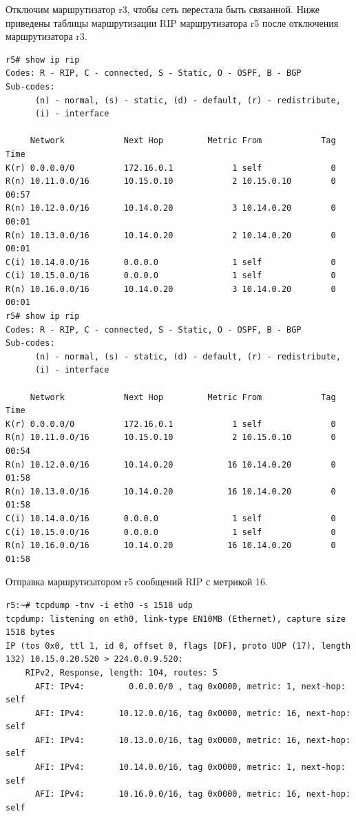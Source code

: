 \documentclass[a4paper,12pt]{article}
\begin{document}
Отключим маршрутизатор r3, чтобы сеть перестала быть связанной.
Ниже приведены таблицы маршрутизации RIP маршрутизатора r5 после отключения маршрутизатора r3.

\begin{Verbatim}
r5# show ip rip
Codes: R - RIP, C - connected, S - Static, O - OSPF, B - BGP
Sub-codes:
      (n) - normal, (s) - static, (d) - default, (r) - redistribute,
      (i) - interface

     Network            Next Hop         Metric From            Tag Time
K(r) 0.0.0.0/0          172.16.0.1            1 self              0
R(n) 10.11.0.0/16       10.15.0.10            2 10.15.0.10        0 00:57
R(n) 10.12.0.0/16       10.14.0.20            3 10.14.0.20        0 00:01
R(n) 10.13.0.0/16       10.14.0.20            2 10.14.0.20        0 00:01
C(i) 10.14.0.0/16       0.0.0.0               1 self              0
C(i) 10.15.0.0/16       0.0.0.0               1 self              0
R(n) 10.16.0.0/16       10.14.0.20            3 10.14.0.20        0 00:01
r5# show ip rip
Codes: R - RIP, C - connected, S - Static, O - OSPF, B - BGP
Sub-codes:
      (n) - normal, (s) - static, (d) - default, (r) - redistribute,
      (i) - interface

     Network            Next Hop         Metric From            Tag Time
K(r) 0.0.0.0/0          172.16.0.1            1 self              0
R(n) 10.11.0.0/16       10.15.0.10            2 10.15.0.10        0 00:54
R(n) 10.12.0.0/16       10.14.0.20           16 10.14.0.20        0 01:58
R(n) 10.13.0.0/16       10.14.0.20           16 10.14.0.20        0 01:58
C(i) 10.14.0.0/16       0.0.0.0               1 self              0
C(i) 10.15.0.0/16       0.0.0.0               1 self              0
R(n) 10.16.0.0/16       10.14.0.20           16 10.14.0.20        0 01:58
\end{Verbatim}

Отправка маршрутизатором r5 сообщений RIP с метрикой 16.

\begin{Verbatim}
r5:~# tcpdump -tnv -i eth0 -s 1518 udp
tcpdump: listening on eth0, link-type EN10MB (Ethernet), capture size 1518 bytes
IP (tos 0x0, ttl 1, id 0, offset 0, flags [DF], proto UDP (17), length 132) 10.15.0.20.520 > 224.0.0.9.520: 
	RIPv2, Response, length: 104, routes: 5
	  AFI: IPv4:         0.0.0.0/0 , tag 0x0000, metric: 1, next-hop: self
	  AFI: IPv4:       10.12.0.0/16, tag 0x0000, metric: 16, next-hop: self
	  AFI: IPv4:       10.13.0.0/16, tag 0x0000, metric: 16, next-hop: self
	  AFI: IPv4:       10.14.0.0/16, tag 0x0000, metric: 1, next-hop: self
	  AFI: IPv4:       10.16.0.0/16, tag 0x0000, metric: 16, next-hop: self
\end{Verbatim}
\end{document}
